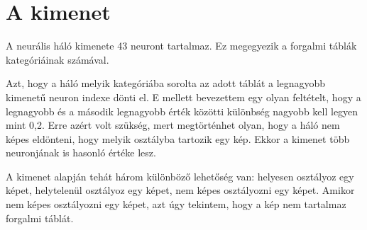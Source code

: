 \chapter{A kimenet}\label{ch:output}

A neurális háló kimenete 43 neuront tartalmaz. Ez megegyezik a forgalmi táblák kategóriáinak számával. 

Azt, hogy a háló melyik kategóriába sorolta az adott táblát a legnagyobb kimenetű neuron indexe dönti el. E mellett bevezettem egy olyan feltételt, hogy a legnagyobb és a második legnagyobb érték közötti különbség nagyobb kell legyen mint 0,2. Erre azért volt szükség, mert megtörténhet olyan, hogy a háló nem képes eldönteni, hogy melyik osztályba tartozik egy kép. Ekkor a kimenet több neuronjának is hasonló értéke lesz. 

A kimenet alapján tehát három különböző lehetőség van: helyesen osztályoz egy képet, helytelenül osztályoz egy képet, nem képes osztályozni egy képet. Amikor nem képes osztályozni egy képet, azt úgy tekintem, hogy a kép nem tartalmaz forgalmi táblát. 
